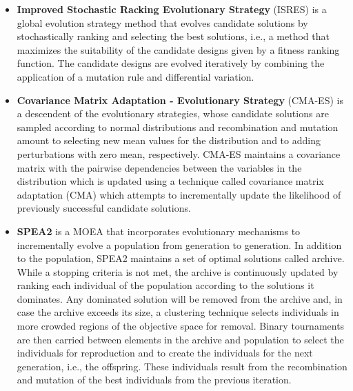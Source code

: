 \begin{itemize}
	\item \textbf{Improved Stochastic Racking Evolutionary Strategy} (ISRES) \cite{Runarsson2000} is a global evolution strategy method that evolves candidate solutions by stochastically ranking and selecting the best solutions, i.e., a method that maximizes the suitability of the candidate designs given by a fitness ranking function. The candidate designs are evolved iteratively by combining the application of a mutation rule and differential variation.
			
	\item \textbf{Covariance Matrix Adaptation - Evolutionary Strategy} (CMA-ES) \cite{Hansen2006} is a descendent of the evolutionary strategies, whose candidate solutions are sampled according to normal distributions and recombination and mutation amount to selecting new mean values for the distribution and to adding perturbations with zero mean, respectively. CMA-ES maintains a covariance matrix with the pairwise dependencies between the variables in the distribution which is updated using a technique called covariance matrix adaptation (CMA) which attempts to incrementally update the likelihood of previously successful candidate solutions.
	
	\item \textbf{SPEA2} \cite{Zitzler2001SPEA2} is a \ac{MOEA} that incorporates evolutionary mechanisms to incrementally evolve a population from generation to generation. In addition to the population, SPEA2 maintains a set of optimal solutions called archive. While a stopping criteria is not met, the archive is continuously updated by ranking each individual of the population according to the solutions it dominates. Any dominated solution will be removed from the archive and, in case the archive exceeds its size, a clustering technique selects individuals in more crowded regions of the objective space for removal. Binary tournaments are then carried between elements in the archive and population to select the individuals for reproduction and to create the individuals for the next generation, i.e., the offspring. These individuals result from the recombination and mutation of the best individuals from the previous iteration. 
	

\end{itemize}
